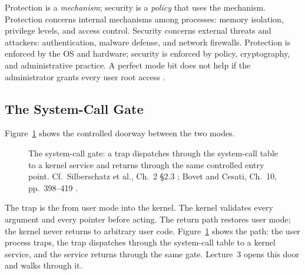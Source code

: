 \documentclass[11pt]{article}
\begin{document}
Protection is a \emph{mechanism}; security is a \emph{policy} that uses the
mechanism. Protection concerns internal mechanisms among processes: memory
isolation, privilege levels, and access control. Security concerns external
threats and attackers: authentication, malware defense, and network firewalls.
Protection is enforced by the OS and hardware; security is enforced by policy,
cryptography, and administrative practice. A perfect mode bit does not help if
the administrator grants every user root access
\cite{StallingsOS_internals_design_principles}.

\subsection{The System-Call Gate}

Figure~\ref{fig:syscall-gate} shows the controlled doorway between the two
modes.

\begin{figure}[h]
  \centering
  \caption{The system-call gate: a trap dispatches through the system-call table
  to a kernel service and returns through the same controlled entry point.
  Cf.\ Silberschatz et al., Ch.~2 \S2.3
  \cite{SilberschatzOSC_operating_system_concepts}; Bovet and Cesati, Ch.~10,
  pp.~398--419 \cite{BovetCesati_understanding_linux_kernel}.}
  \label{fig:syscall-gate}
\end{figure}

The trap is the  from user mode into the kernel. The
kernel validates every argument and every pointer before acting. The return
path restores user mode; the kernel never returns to arbitrary user code.
Figure~\ref{fig:syscall-gate} shows the path: the user process traps, the trap
dispatches through the system-call table to a kernel service, and the service
returns through the same gate. Lecture~3 opens this door and walks through it.
\end{document}

